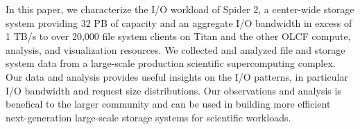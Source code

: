In this paper, we characterize the I/O workload of Spider 2, a center-wide
storage system providing 32 PB of capacity and an aggregate I/O bandwidth in
excess of 1 TB/s to over 20,000 file system clients on Titan and the other OLCF
compute, analysis, and visualization resources. 
We collected and analyzed file and storage system data from a large-scale production scientific
supercomputing complex. Our data and analysis provides useful insights on the
I/O patterns, in particular I/O bandwidth and request size distributions. Our
observations and analysis is benefical to the larger community and can be used
in building more efficient next-generation large-scale storage systems for
scientific workloads.  

